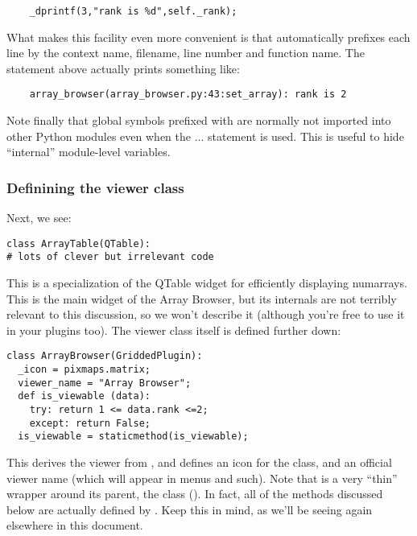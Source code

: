 \documentclass[12pt,twoside]{book}
\begin{document}
\begin{verbatim}  
    _dprintf(3,"rank is %d",self._rank);
\end{verbatim}

  What makes this facility even more convenient is that 
  automatically prefixes each line by the context name, filename, line number
  and function name. The statement above actually prints something like:

\begin{verbatim}  
    array_browser(array_browser.py:43:set_array): rank is 2
\end{verbatim}

  Note finally that global symbols prefixed with  are normally not
  imported into other Python modules even when the  ... 
  statement is used. This is useful to hide ``internal'' module-level
  variables.

\subsubsection{Definining the viewer class} 

  Next, we see:

\begin{verbatim}  
class ArrayTable(QTable):
# lots of clever but irrelevant code
\end{verbatim}

  This is a specialization of the QTable widget for efficiently displaying
  numarrays. This is the main widget of the Array Browser, but its internals are
  not terribly relevant to this discussion, so we won't describe it (although
  you're free to use it in your plugins too). The viewer class itself is defined
  further down:

\begin{verbatim}  
class ArrayBrowser(GriddedPlugin):
  _icon = pixmaps.matrix;
  viewer_name = "Array Browser";
  def is_viewable (data):
    try: return 1 <= data.rank <=2;
    except: return False;
  is_viewable = staticmethod(is_viewable);
\end{verbatim}

  This derives the viewer from , and defines an icon for the
  class, and an official viewer name (which will appear in menus and such). Note
  that  is a very ``thin'' wrapper around its parent, the
   class (). In fact, all of the
  methods discussed below are actually defined by . Keep this in
  mind, as we'll be seeing  again elsewhere in this document.
  
\end{document}
